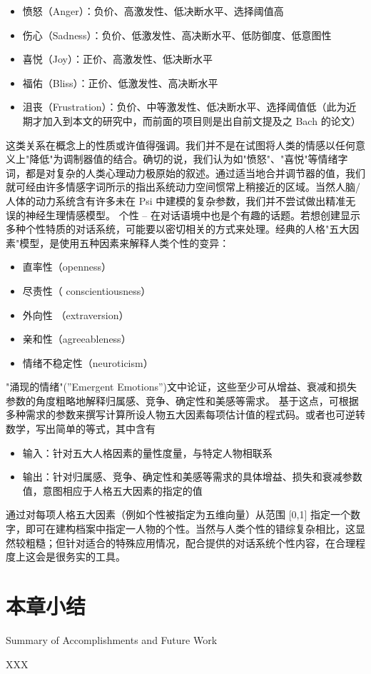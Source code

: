 \begin{itemize}
\item 愤怒（Anger）：负价、高激发性、低决断水平、选择阈值高
\item 伤心（Sadness）：负价、低激发性、高决断水平、低防御度、低意图性 
\item 喜悦（Joy）：正价、高激发性、低决断水平
\item 福佑（Bliss）：正价、低激发性、高决断水平
\item 沮丧（Frustration）：负价、中等激发性、低决断水平、选择阈值低（此为近期才加入到本文的研究中，而前面的项目则是出自前文提及之 Bach 的论文）
\end{itemize}

这类关系在概念上的性质或许值得强调。我们并不是在试图将人类的情感以任何意义上"降低"为调制器值的结合。确切的说，我们认为如"愤怒"、"喜悦"等情绪字词，都是对复杂的人类心理动力极原始的叙述。通过适当地合并调节器的值，我们就可经由许多情感字词所示的指出系统动力空间惯常上稍接近的区域。当然人脑/人体的动力系统含有许多未在 Psi 中建模的复杂参数，我们并不尝试做出精准无误的神经生理情感模型。
个性 – 在对话语境中也是个有趣的话题。若想创建显示多种个性特质的对话系统，可能要以密切相关的方式来处理。经典的人格"五大因素"模型，是使用五种因素来解释人类个性的变异：

\begin{itemize}
\item 直率性（openness）
\item 尽责性（ conscientiousness）
\item 外向性 （extraversion）
\item 亲和性（agreeableness）
\item 情绪不稳定性（neuroticism）
\end{itemize}

"涌现的情绪"(”Emergent Emotions”)文中论证，这些至少可从增益、衰减和损失参数的角度粗略地解释归属感、竞争、确定性和美感等需求。 
基于这点，可根据多种需求的参数来撰写计算所设人物五大因素每项估计值的程式码。或者也可逆转数学，写出简单的等式，其中含有

\begin{itemize}
\item 输入：针对五大人格因素的量性度量，与特定人物相联系 
\item 输出：针对归属感、竞争、确定性和美感等需求的具体增益、损失和衰减参数值，意图相应于人格五大因素的指定的值
\end{itemize}

通过对每项人格五大因素（例如个性被指定为五维向量）从范围 [0,1] 指定一个数字，即可在建构档案中指定一人物的个性。当然与人类个性的错综复杂相比，这显然较粗糙；但针对适合的特殊应用情况，配合提供的对话系统个性内容，在合理程度上这会是很务实的工具。

\section{本章小结}{Summary of Accomplishments and Future Work}

XXX
